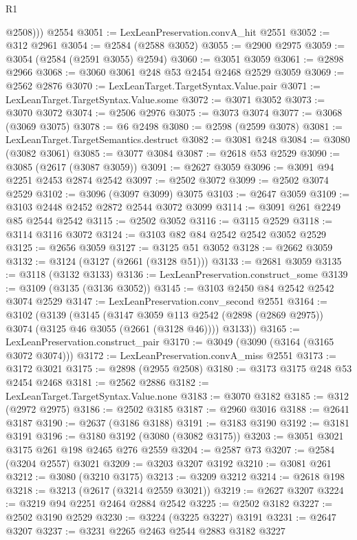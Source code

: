 \begin{lexlean}{R1}
\begin{coremodule}
          @2508)))
    @2554
@3051 := LexLeanPreservation.convA_hit @2551
@3052 := @312 @2961
@3054 := @2584 (@2588 @3052)
@3055 := @2900 @2975
@3059 := @3054 (@2584 (@2591 @3055) @2594)
@3060 := @3051 @3059
@3061 := @2898 @2966
@3068 := @3060 @3061 @248 @53 @2454 @2468 @2529 @3059
@3069 := @2562 @2876
@3070 := LexLeanTarget.TargetSyntax.Value.pair
@3071 := LexLeanTarget.TargetSyntax.Value.some
@3072 := @3071 @3052
@3073 := @3070 @3072
@3074 := @2506 @2976
@3075 := @3073 @3074
@3077 := @3068 (@3069 @3075)
@3078 := @6 @2498
@3080 := @2598 (@2599 @3078)
@3081 := LexLeanTarget.TargetSemantics.destruct
@3082 := @3081 @248
@3084 := @3080 (@3082 @3061)
@3085 := @3077 @3084
@3087 := @2618 @53 @2529
@3090 := @3085 (@2617 (@3087 @3059))
@3091 := @2627 @3059
@3096 := @3091 @94 @2251 @2453 @2874 @2542
@3097 := @2502 @3072
@3099 := @2502 @3074 @2529
@3102 := @3096 (@3097 @3099) @3075
@3103 := @2647 @3059
@3109 := @3103 @2448 @2452 @2872 @2544 @3072 @3099
@3114 := @3091 @261 @2249 @85 @2544 @2542
@3115 := @2502 @3052
@3116 := @3115 @2529
@3118 := @3114 @3116 @3072
@3124 := @3103 @82 @84 @2542 @2542 @3052 @2529
@3125 := @2656 @3059
@3127 := @3125 @51 @3052
@3128 := @2662 @3059
@3132 := @3124 (@3127 (@2661 (@3128 @51)))
@3133 := @2681 @3059
@3135 := @3118 (@3132 @3133)
@3136 := LexLeanPreservation.construct_some
@3139 := @3109 (@3135 (@3136 @3052))
@3145 := @3103 @2450 @84 @2542 @2542 @3074 @2529
@3147 := LexLeanPreservation.conv_second @2551
@3164 := @3102
    (@3139
      (@3145
        (@3147 @3059 @113 @2542 (@2898 (@2869 @2975)) @3074 (@3125 @46 @3055 (@2661 (@3128 @46))))
        @3133))
@3165 := LexLeanPreservation.construct_pair
@3170 := @3049 (@3090 (@3164 (@3165 @3072 @3074)))
@3172 := LexLeanPreservation.convA_miss @2551
@3173 := @3172 @3021
@3175 := @2898 (@2955 @2508)
@3180 := @3173 @3175 @248 @53 @2454 @2468
@3181 := @2562 @2886
@3182 := LexLeanTarget.TargetSyntax.Value.none
@3183 := @3070 @3182
@3185 := @312 (@2972 @2975)
@3186 := @2502 @3185
@3187 := @2960 @3016
@3188 := @2641 @3187
@3190 := @2637 (@3186 @3188)
@3191 := @3183 @3190
@3192 := @3181 @3191
@3196 := @3180 @3192 (@3080 (@3082 @3175))
@3203 := @3051 @3021 @3175 @261 @198 @2465 @276 @2559
@3204 := @2587 @73
@3207 := @2584 (@3204 @2557) @3021
@3209 := @3203 @3207 @3192
@3210 := @3081 @261
@3212 := @3080 (@3210 @3175)
@3213 := @3209 @3212
@3214 := @2618 @198
@3218 := @3213 (@2617 (@3214 @2559 @3021))
@3219 := @2627 @3207
@3224 := @3219 @94 @2251 @2464 @2884 @2542
@3225 := @2502 @3182
@3227 := @2502 @3190 @2529
@3230 := @3224 (@3225 @3227) @3191
@3231 := @2647 @3207
@3237 := @3231 @2265 @2463 @2544 @2883 @3182 @3227

\end{coremodule}
\end{lexlean}
